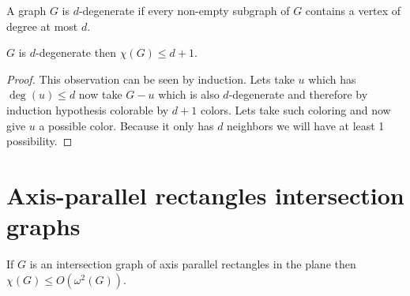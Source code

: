 \begin{defn}
	A graph $G$ is $d$-degenerate if every non-empty subgraph of $G$ contains a vertex of degree at most $d$.
\end{defn}

\begin{observ}
	$G$ is $d$-degenerate then $\chi(G) \leq d+1$.
\end{observ}

\begin{proof}
	This observation can be seen by induction. Lets take $u$ which has $\deg(u) \leq d$ now take $G - u$ which is also $d$-degenerate and therefore by induction hypothesis colorable by $d+1$ colors. Lets take such coloring and now give $u$ a possible color. Because it only has $d$ neighbors we will have at least 1 possibility.
\end{proof}

\section{Axis-parallel rectangles intersection graphs}

\begin{thm}
	If $G$ is an intersection graph of axis parallel rectangles in the plane then $\chi(G) \leq O(\omega^2 (G))$.
\end{thm}

